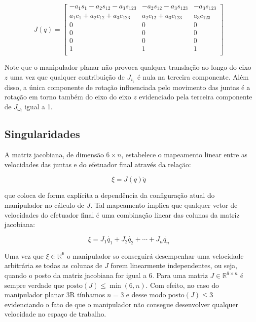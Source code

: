 \begin{equation}
    J(q) = \begin{bmatrix}
        -a_1 s_1 - a_2 s_{12} - a_3 s_{123} & -a_2 s_{12} - a_3 s_{123} & -a_3 s_{123} \\
        a_1 c_1 + a_2 c_{12} + a_3 c_{123}  & a_2 c_{12} + a_3 c_{123}  & a_3 c_{123}  \\
        0                                   & 0                         & 0            \\
        0                                   & 0                         & 0            \\
        0                                   & 0                         & 0            \\
        1                                   & 1                         & 1            \\
    \end{bmatrix}
\end{equation}

Note que o manipulador planar não provoca qualquer translação ao longo do eixo
\(z\) uma vez que qualquer contribuição de \(J_{v_i}\) é nula na terceira
componente. Além disso, a única componente de rotação influenciada pelo
movimento das juntas é a rotação em torno também do eixo do eixo \(z\)
evidenciado pela terceira componente de \(J_{\omega_i}\) igual a 1.

\subsection{Singularidades}

A matriz jacobiana, de dimensão \(6 \times n\), estabelece o mapeamento linear
entre as velocidades das juntas e do efetuador final através da relação:

\begin{equation}\label{eq:jacobian-mapping}
    \xi = J(q) \dot{q}
\end{equation}

que coloca de forma explícita a dependência da configuração atual do
manipulador no cálculo de \(J\). Tal mapeamento implica que qualquer vetor de
velocidades do efetuador final é uma combinação linear das colunas da matriz
jacobiana:

\begin{equation}
    \xi = J_1 \dot{q_1} + J_2 \dot{q_2} + \cdots + J_n \dot{q_n}
\end{equation}

Uma vez que \(\xi \in \mathbb{R}^6\) o manipulador so conseguirá desempenhar
uma velocidade arbitrária se todas as colunas de \(J\) forem linearmente
independentes, ou seja, quando o posto da matriz jacobiana for igual a \(6\).
Para uma matriz \(J \in \mathbb{R}^{6 \times n}\) é sempre verdade que
\(\text{posto}(J) \leq \min(6, n)\). Com efeito, no caso do manipulador planar
3R tínhamos \(n = 3\) e desse modo \(\text{posto}(J) \leq 3\) evidenciando o
fato de que o manipulador não consegue desenvolver qualquer velocidade no
espaço de trabalho.

